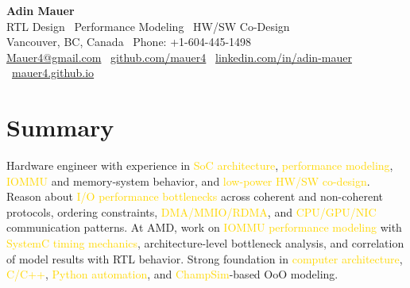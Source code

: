 \documentclass[11pt]{article}
\newcommand{\gold}[1]{\textcolor{gold}{#1}}
\begin{document}
\begin{center}
  {\LARGE \textbf{Adin Mauer}}\\
  RTL Design \textbar\ Performance Modeling \textbar\ HW/SW Co-Design\\
  Vancouver, BC, Canada \textbar\ Phone: +1-604-445-1498\\
  \href{mailto:Mauer4@gmail.com}{Mauer4@gmail.com} \textbar\ \href{https://github.com/mauer4}{github.com/mauer4} \textbar\ \href{https://www.linkedin.com/in/adin-mauer-4774821a1/}{linkedin.com/in/adin-mauer} \textbar\ \href{https://mauer4.github.io/}{mauer4.github.io}
\end{center}

\section{Summary}
Hardware engineer with experience in \gold{SoC architecture}, \gold{performance modeling}, \gold{IOMMU} and memory-system behavior, and \gold{low-power HW/SW co-design}. Reason about \gold{I/O performance bottlenecks} across coherent and non-coherent protocols, ordering constraints, \gold{DMA/MMIO/RDMA}, and \gold{CPU/GPU/NIC} communication patterns. At AMD, work on \gold{IOMMU performance modeling} with \gold{SystemC timing mechanics}, architecture-level bottleneck analysis, and correlation of model results with RTL behavior. Strong foundation in \gold{computer architecture}, \gold{C/C++}, \gold{Python automation}, and \gold{ChampSim}-based OoO modeling.
\end{document}
